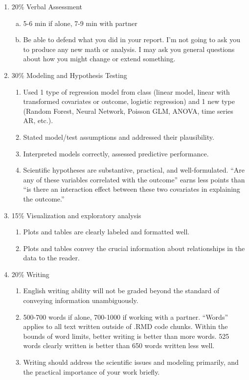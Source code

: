 \documentclass[12pt]{article}
\begin{document}
\begin{enumerate}
	\item 20\% Verbal Assessment
	\begin{enumerate}[(a)]
		\item 5-6 min if alone, 7-9 min with partner
		\item Be able to defend what you did in your report. I'm not going to ask you to produce any new math or analysis. I may ask you general questions about how you might change or extend something.
	\end{enumerate}
	\item 30\% Modeling and Hypothesis Testing
	\begin{enumerate}
		\item Used 1 type of regression model from class (linear model, linear with transformed covariates or outcome, logistic regression) and 1 new type (Random Forest, Neural Network, Poisson GLM, ANOVA, time series AR, etc.).
		\item Stated model/test assumptions and addressed their plausibility.
		\item Interpreted models correctly, assessed predictive performance.
		\item Scientific hypotheses are substantive, practical, and well-formulated. ``Are any of these variables correlated with the outcome'' earns less points than ``is there an interaction effect between these two covariates in explaining the outcome.''
	\end{enumerate}
	\item 15\% Visualization and exploratory analysis
	\begin{enumerate}
		\item Plots and tables are clearly labeled and formatted well.
		\item Plots and tables convey the crucial information about relationships in the data to the reader.
	\end{enumerate}
	\item 20\% Writing
	\begin{enumerate}
		\item English writing ability will not be graded beyond the standard of conveying information unambiguously.
		\item 500-700 words if alone, 700-1000 if working with a partner. ``Words'' applies to all text written outside of .RMD code chunks. Within the bounds of word limits, better writing is better than more words. 525 words clearly written is better than 650 words written less well.
		\item Writing should address the scientific issues and modeling primarily, and the practical importance of your work briefly.

\end{enumerate}
\end{enumerate}
\end{document}
